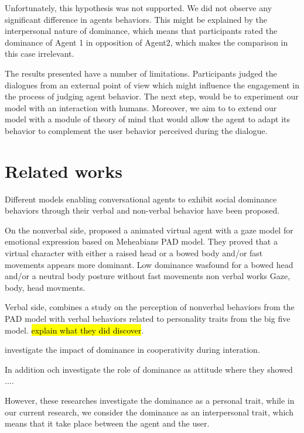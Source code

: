 \documentclass{llncs}
\begin{document}
			 Unfortunately, this hypothesis was not supported. We did not observe any significant difference in agents behaviors. This might be explained by the interpersonal nature of dominance, which means that participants rated the dominance of Agent 1 in opposition of Agent2, which makes the comparison in this case irrelevant. 
			 
			 \par  The results presented have a number of limitations. Participants judged the dialogues from an external point of view which might influence the engagement in the process of judging agent behavior. The next step, would be to experiment our model with an interaction with humans. Moreover, we aim to to extend our model with a module of theory of mind that would allow the agent to adapt its behavior to complement the user behavior perceived during the dialogue.
	
			 \section{Related works}
				Different models enabling conversational agents to exhibit social dominance behaviors through their verbal and non-verbal behavior have been proposed. 
				
				On the nonverbal side,  \cite{lance2008relation} proposed a animated virtual agent with a gaze model for emotional expression based on Meheabians PAD model. They proved that a virtual character with either a raised head or a
				bowed body and/or fast movements appears more dominant. Low dominance wasfound for a bowed head and/or a neutral body posture without fast movements	non verbal works
				Gaze, body, head movments.
				
				Verbal side, \cite{bee2010bossy} combines a study on the perception of nonverbal behaviors from the PAD model with verbal behaviors related to personality traits from the big five model. \hl{explain what they did discover}.
				
				\cite{strassmann2016effect}investigate the impact of dominance in cooperativity during interation.
				
				In addition och investigate the role of dominance as attitude where they showed ....
				
				However, these researches investigate the dominance as a personal trait, while in our current research, we consider the dominance as an interpersonal trait, which means that it take place between the agent and the user.
				
\end{document}
